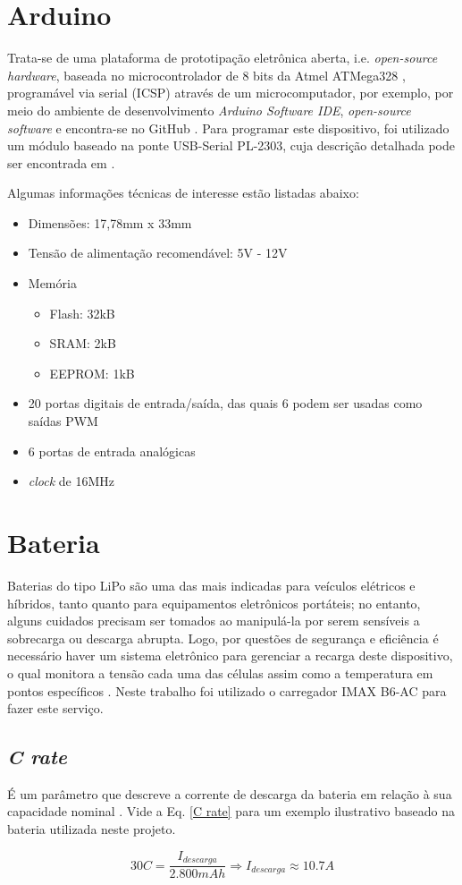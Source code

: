 \section{Arduino}
Trata-se de uma plataforma de prototipação eletrônica aberta, i.e. \textit{open-source hardware}, baseada no microcontrolador de 8 bits da Atmel 
ATMega328 \cite{ATMega}, programável via serial (ICSP) através de um microcomputador, por exemplo, por meio do ambiente de desenvolvimento 
\textit{Arduino Software IDE}, \textit{open-source software} e encontra-se no GitHub \cite{ArduSoft}.
Para programar este dispositivo, foi utilizado um módulo baseado na ponte USB-Serial PL-2303, cuja descrição detalhada pode ser encontrada em 
\cite{PL2303}.

Algumas informações técnicas \cite{ArduInfo} de interesse estão listadas abaixo: 
\begin{itemize}
 \item Dimensões: 17,78mm x 33mm
 \item Tensão de alimentação recomendável: 5V - 12V
 \item Memória 
 \begin{itemize}
  \item Flash: 32kB 
  \item SRAM: 2kB
  \item EEPROM: 1kB
 \end{itemize}

 \item 20 portas digitais de entrada/saída, das quais 6 podem ser usadas como saídas PWM
 \item 6 portas de entrada analógicas
 \item \textit{clock} de 16MHz
\end{itemize}


\section{Bateria} %
Baterias do tipo LiPo são uma das mais indicadas para veículos elétricos e híbridos, tanto quanto para equipamentos eletrônicos portáteis; no 
entanto, alguns cuidados precisam ser tomados ao manipulá-la por serem sensíveis a sobrecarga ou descarga abrupta.
Logo, por questões de segurança e eficiência é necessário haver um sistema eletrônico para gerenciar a recarga deste dispositivo, o qual monitora a 
tensão cada uma das células assim como a temperatura em pontos específicos \cite{battery}.
Neste trabalho foi utilizado o carregador IMAX B6-AC para fazer este serviço.
\subsection{\textit{C rate}}
É um parâmetro que descreve a corrente de descarga da bateria em relação à sua capacidade nominal \cite{bateria}.
Vide a Eq. \ref{C rate} para um exemplo ilustrativo baseado na bateria utilizada neste projeto.

\begin{equation}
 \label{C rate}
 30 C = \frac{ I_{descarga} }{ 2.800 mAh} \Rightarrow I_{descarga} \approx 10.7A
\end{equation}
